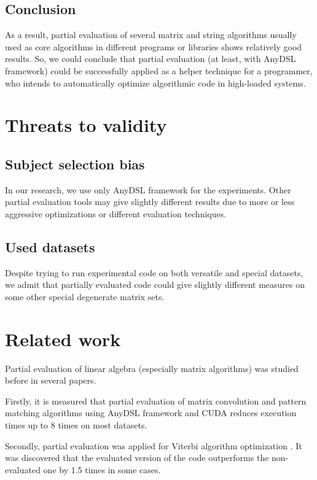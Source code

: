 \documentclass[conference]{IEEEtran}
\begin{document}
\subsection{Conclusion}
As a result, partial evaluation of several matrix and string algorithms usually used as core algorithms in different programs or libraries shows relatively good results. So, we could conclude that partial evaluation (at least, with AnyDSL framework) could be successfully applied as a helper technique for a programmer, who intends to automatically optimize algorithmic code in high-loaded systems.


\section{Threats to validity}

\subsection{Subject selection bias}
In our research, we use only AnyDSL framework for the experiments. Other partial evaluation tools may give slightly different results due to more or less aggressive optimizations or different evaluation techniques.

\subsection{Used datasets}
Despite trying to run experimental code on both versatile and special datasets, we admit that partially evaluated code could give slightly different measures on some other special degenerate matrix sets.

\section{Related work}

Partial evaluation of linear algebra (especially matrix algorithms) was studied before in several papers.

Firstly, it is measured \cite{tyurin2020optimizing} that partial evaluation of matrix convolution and pattern matching algorithms using AnyDSL framework and CUDA reduces execution times up to 8 times on most datasets.

Secondly, partial evaluation was applied for Viterbi algorithm optimization \cite{viterbiseim}. It was discovered that the evaluated version of the code outperforms the non-evaluated one by 1.5 times in some cases.
\end{document}
